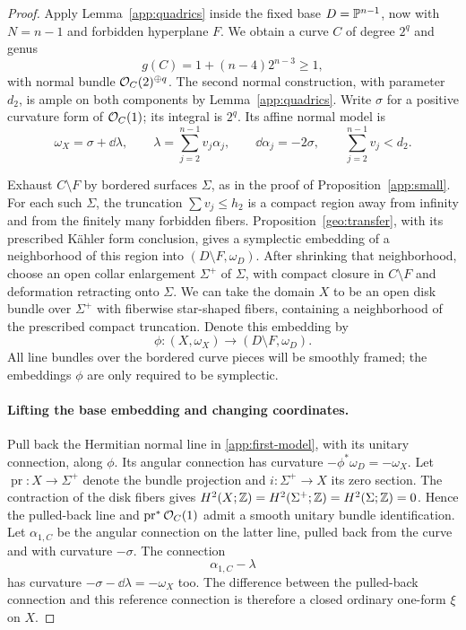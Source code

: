 \begin{proof}
Apply Lemma~\ref{app:quadrics} inside the fixed base $D=\mathbb P^{n-1}$, now with
$N=n-1$ and forbidden hyperplane $F$. We obtain a curve $C$ of degree $2^q$
and genus
\[
 g(C)=1+(n-4)2^{n-3}\ge1,
\]
with normal bundle $\mathcal O_C(2)^{\oplus q}$. The second normal construction,
with parameter $d_2$, is ample on both components by
Lemma~\ref{app:quadrics}. Write $\sigma$ for a positive curvature form of
$\mathcal O_C(1)$; its integral is $2^q$. Its affine normal model is
\begin{equation}\label{app:second-model}
 \omega_X=\sigma+\dd\lambda,\qquad
 \lambda=\sum_{j=2}^{n-1}v_j\alpha_j,\qquad
 \dd\alpha_j=-2\sigma,
 \qquad \sum_{j=2}^{n-1}v_j<d_2.
\end{equation}

Exhaust $C\setminus F$ by bordered surfaces $\Sigma$, as in the proof of
Proposition~\ref{app:small}. For each such $\Sigma$, the truncation
$\sum v_j\le h_2$ is a compact region away from infinity and from the
finitely many forbidden fibers. Proposition~\ref{geo:transfer}, with its
prescribed K\"ahler form conclusion, gives a symplectic embedding of a
neighborhood of this region into $(D\setminus F,\omega_D)$. After shrinking that neighborhood, choose an open collar enlargement
$\Sigma^+$ of $\Sigma$, with compact closure in $C\setminus F$ and
deformation retracting onto $\Sigma$. We can take the domain $X$ to be an
open disk bundle over $\Sigma^+$ with fiberwise star-shaped fibers,
containing a neighborhood of the prescribed compact truncation.
Denote this embedding by
\[
 \phi:(X,\omega_X)\longrightarrow(D\setminus F,\omega_D).
\]
All line bundles over the bordered curve pieces will be smoothly framed;
the embeddings $\phi$ are only required to be symplectic.

\paragraph{Lifting the base embedding and changing coordinates.}
Pull back the Hermitian normal line in \eqref{app:first-model}, with its
unitary connection, along $\phi$. Its angular connection has curvature
$-\phi^*\omega_D=-\omega_X$. Let $\operatorname{pr}:X\to\Sigma^+$ denote the bundle
projection and $i:\Sigma^+\to X$ its zero section. The contraction of the
disk fibers gives $H^2(X;\mathbb Z)=H^2(\Sigma^+;\mathbb Z)=H^2(\Sigma;\mathbb Z)=0$. Hence the pulled-back line
and $\operatorname{pr}^*\mathcal O_C(1)$ admit a smooth unitary bundle identification.
Let $\alpha_{1,C}$ be the angular connection on the latter line, pulled
back from the curve and with curvature $-\sigma$. The connection
\[
 \alpha_{1,C}-\lambda
\]
has curvature $-\sigma-\dd\lambda=-\omega_X$ too. The difference between
the pulled-back connection and this reference connection is therefore a
closed ordinary one-form $\xi$ on $X$.


\end{proof}
